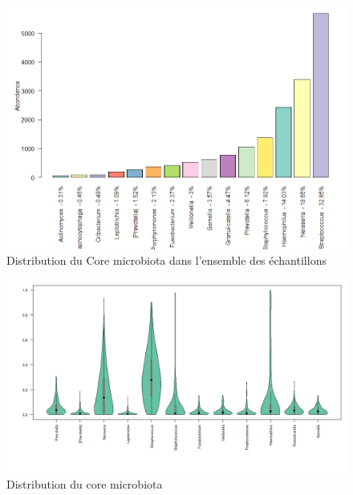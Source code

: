 \documentclass[12pt,a4paper]{article}
\begin{document}
\begin{figure}[t]
\begin{center}
\includegraphics[scale=0.5]{img/core.png}\hfill
\end{center}
\caption{Distribution du Core microbiota dans l'ensemble des échantillons}
\label{core}
\end{figure}



\begin{figure}[t]
\begin{center}
\includegraphics[scale=0.5]{img/variability.png}\hfill
\end{center}
\caption{Distribution du core microbiota}
\label{violon}
\end{figure}
\end{document}
